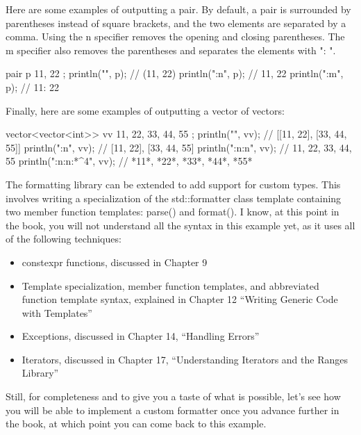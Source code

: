 Here are some examples of outputting a pair. By default, a pair is surrounded by parentheses instead of square brackets, and the two elements are separated by a comma. Using the n specifier removes the opening and closing parentheses. The m specifier also removes the parentheses and separates the elements with ": ".

\begin{cpp}
pair p { 11, 22 };
println("{}", p);     // (11, 22)
println("{:n}", p);   // 11, 22
println("{:m}", p);   // 11: 22
\end{cpp}

Finally, here are some examples of outputting a vector of vectors:

\begin{cpp}
vector<vector<int>> vv { {11, 22}, {33, 44, 55} };
println("{}", vv);          // [[11, 22], [33, 44, 55]]
println("{:n}", vv);        // [11, 22], [33, 44, 55]
println("{:n:n}", vv);      // 11, 22, 33, 44, 55
println("{:n:n:*^4}", vv);  // *11*, *22*, *33*, *44*, *55*
\end{cpp}


The formatting library can be extended to add support for custom types. This involves writing a specialization of the std::formatter class template containing two member function templates: parse() and format(). I know, at this point in the book, you will not understand all the syntax in this example yet, as it uses all of the following techniques:

\begin{itemize}
\item
constexpr functions, discussed in Chapter 9

\item
Template specialization, member function templates, and abbreviated function template syntax, explained in Chapter 12 “Writing Generic Code with Templates”

\item
Exceptions, discussed in Chapter 14, “Handling Errors”

\item
Iterators, discussed in Chapter 17, “Understanding Iterators and the Ranges Library”
\end{itemize}

Still, for completeness and to give you a taste of what is possible, let’s see how you will be able to implement a custom formatter once you advance further in the book, at which point you can come back to this example.


